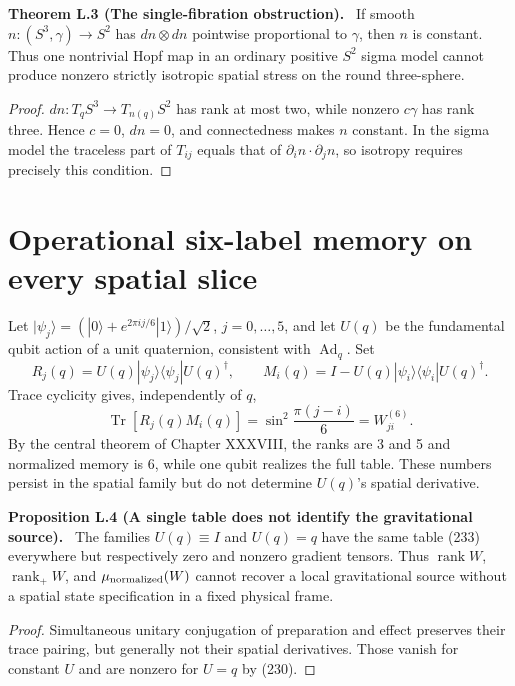\documentclass[11pt,a4paper,oneside]{book}
\DeclareMathOperator{\rank}{rank}\DeclareMathOperator{\Tr}{Tr}
\newcommand{\statement}[3]{\par\medskip\noindent\textbf{#1 #2 (#3).}\ }
\begin{document}
\statement{Theorem}{L.3}{The single-fibration obstruction}
If smooth $n:(S^3,\gamma)\to S^2$ has $dn\otimes dn$ pointwise proportional to $\gamma$, then $n$ is constant. Thus one nontrivial Hopf map in an ordinary positive $S^2$ sigma model cannot produce nonzero strictly isotropic spatial stress on the round three-sphere.
\begin{proof}
$dn:T_qS^3\to T_{n(q)}S^2$ has rank at most two, while nonzero $c\gamma$ has rank three. Hence $c=0$, $dn=0$, and connectedness makes $n$ constant. In the sigma model the traceless part of $T_{ij}$ equals that of $\partial_in\cdot\partial_jn$, so isotropy requires precisely this condition.
\end{proof}
\section{Operational six-label memory on every spatial slice}
Let $|\psi_j\rangle=(|0\rangle+e^{2\pi ij/6}|1\rangle)/\sqrt2$, $j=0,\ldots,5$, and let $U(q)$ be the fundamental qubit action of a unit quaternion, consistent with $\operatorname{Ad}_q$. Set
\begin{equation}R_j(q)=U(q)|\psi_j\rangle\langle\psi_j|U(q)^\dagger,\qquad M_i(q)=I-U(q)|\psi_i\rangle\langle\psi_i|U(q)^\dagger.\tag{232}\end{equation}
Trace cyclicity gives, independently of $q$,
\begin{equation}\Tr[R_j(q)M_i(q)]=\sin^2\frac{\pi(j-i)}6=W^{(6)}_{ji}.\tag{233}\end{equation}
By the central theorem of Chapter XXXVIII, the ranks are 3 and 5 and normalized memory is 6, while one qubit realizes the full table. These numbers persist in the spatial family but do not determine $U(q)$'s spatial derivative.
\statement{Proposition}{L.4}{A single table does not identify the gravitational source}
The families $U(q)\equiv I$ and $U(q)=q$ have the same table (233) everywhere but respectively zero and nonzero gradient tensors. Thus $\rank W$, $\rank_+W$, and $\mu_{\rm normalized}(W)$ cannot recover a local gravitational source without a spatial state specification in a fixed physical frame.
\begin{proof}
Simultaneous unitary conjugation of preparation and effect preserves their trace pairing, but generally not their spatial derivatives. Those vanish for constant $U$ and are nonzero for $U=q$ by (230).
\end{proof}
\end{document}
